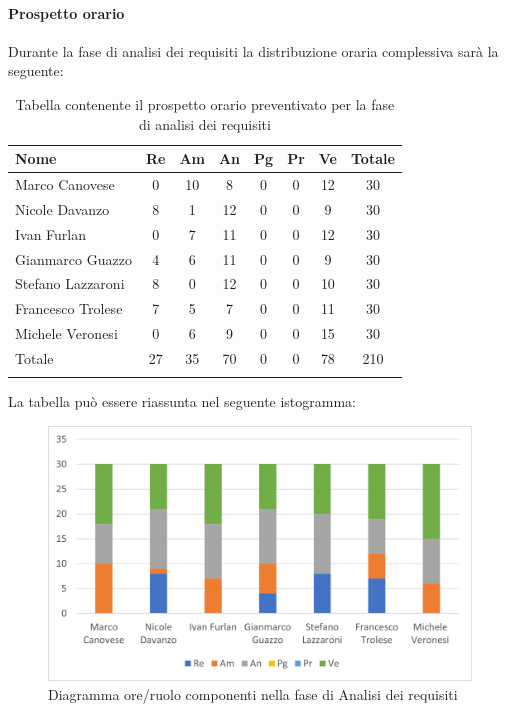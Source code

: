 		\paragraph{Prospetto orario}
			Durante la fase di analisi dei requisiti la distribuzione oraria complessiva sarà la seguente:
			
			\begin{longtable}{|l|c|c|c|c|c|c|c|}
				\hline
				\rowcolor{lighter-grayer}
				\textbf{Nome} & \textbf{Re} & \textbf{Am} & \textbf{An} & \textbf{Pg}  & \textbf{Pr}   & \textbf{Ve} & \textbf{Totale} \\
				\hline
				\endfirsthead
				
				\hline
				Marco Canovese & 0 & 10 & 8 & 0 & 0 & 12 & 30\\
				\hline
				\hline
				Nicole Davanzo & 8 & 1 & 12 & 0 & 0 & 9 & 30\\
				\hline
				\hline
				Ivan Furlan & 0 & 7 & 11 & 0 & 0 & 12 & 30\\
				\hline
				\hline
				Gianmarco Guazzo & 4 & 6 & 11 & 0 & 0 & 9 & 30\\
				\hline
				\hline
				Stefano Lazzaroni & 8 & 0 & 12 & 0 & 0 & 10 & 30\\
				\hline
				\hline
				Francesco Trolese & 7 & 5 & 7 & 0 & 0 & 11 & 30\\
				\hline
				\hline
				Michele Veronesi & 0 & 6 & 9 & 0 & 0 & 15 & 30\\
				\hline 
				\hline
				Totale & 27 & 35 & 70 & 0 & 0 & 78 & 210\\
				\hline
				\rowcolor{white} 
				\caption{Tabella contenente il prospetto orario preventivato per la fase di analisi dei requisiti}
			\end{longtable}

		
			La tabella può essere riassunta nel seguente istogramma:
		
			\begin{figure}[H]
				\centering
				\includegraphics[width=0.8\linewidth]{res/images/preventivo/1-1.png}
				\caption{Diagramma ore/ruolo componenti nella fase di Analisi dei requisiti}
				\label{fig:diagramma suddivisione ruoli fase analisi dei requisiti}
			\end{figure}
		
